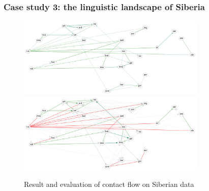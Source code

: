 \subsubsection{Case study 3: the linguistic landscape of Siberia}
 
\begin{figure}
 \includegraphics[width=0.8\textwidth]{figures/siberia-contact-fs-tss.pdf}
 \vspace*{5mm}
 \includegraphics[width=0.8\textwidth]{figures/siberia-contact-fs-tss-eval.pdf}
 \caption{Result and evaluation of contact flow on Siberian data}
 \label{siberia-result-contact}
\end{figure}
 
